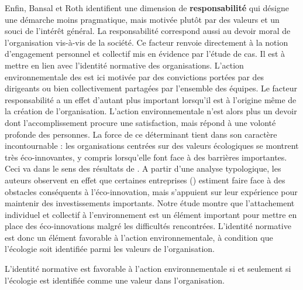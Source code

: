         Enfin, Bansal et Roth identifient une dimension de \textbf{responsabilité} qui désigne une démarche moins pragmatique, mais motivée plutôt par des valeurs et un souci de l'intérêt général. La responsabilité correspond aussi au devoir moral de l'organisation vis-à-vis de la société.
        Ce facteur renvoie directement à la notion d'engagement personnel et collectif mis en évidence par l'étude de cas. Il est à mettre en lien avec l'identité normative des organisations. L'action environnementale des \oess est ici motivée par des convictions portées par des dirigeants ou bien collectivement partagées par l'ensemble des équipes. Le facteur responsabilité a un effet d'autant plus important lorsqu'il est à l'origine même de la création de l'organisation. L'action environnementale n'est alors plus un devoir dont l'accomplissement procure une satisfaction, mais répond à une volonté profonde des personnes. La force de ce déterminant tient dans son caractère incontournable : les organisations centrées sur des valeurs écologiques se montrent très éco-innovantes, y compris lorsqu'elle font face à des barrières importantes. Ceci va dans le sens des résultats de \textcite{marin2015smes}. A partir d'une analyse typologique, les auteurs observent en effet que certaines entreprises () estiment faire face à des obstacles conséquents à l'éco-innovation, mais s'appuient sur leur expérience pour maintenir des investissements importants. Notre étude montre que l'attachement individuel et collectif à l'environnement est un élément important pour mettre en place des éco-innovations malgré les difficultés rencontrées. L'identité normative est donc un élément favorable à l'action environnementale, à condition que l'écologie soit identifiée parmi les valeurs de l'organisation. \\

        \begin{hyp}
        \label{prop:DET3a}
            L'identité normative est favorable à l'action environnementale si et seulement si l'écologie est identifiée comme une valeur dans l'organisation.
        \end{hyp}


